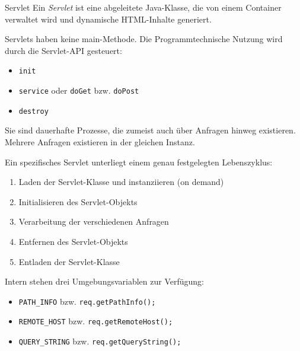 \begin{defi}{Servlet}
    Ein \emph{Servlet} ist eine abgeleitete Java-Klasse, die von einem Container verwaltet wird und dynamische HTML-Inhalte generiert.

    Servlets haben keine main-Methode.
    Die Programmtechnische Nutzung wird durch die Servlet-API gesteuert:
    \begin{itemize}
        \item \texttt{init}
        \item \texttt{service} oder \texttt{doGet} bzw. \texttt{doPost}
        \item \texttt{destroy}
    \end{itemize}

    Sie sind dauerhafte Prozesse, die zumeist auch über Anfragen hinweg existieren.
    Mehrere Anfragen existieren in der gleichen Instanz.

    Ein spezifisches Servlet unterliegt einem genau festgelegten Lebenszyklus:
    \begin{enumerate}
        \item Laden der Servlet-Klasse und instanziieren (on demand)
        \item Initialisieren des Servlet-Objekts
        \item Verarbeitung der verschiedenen Anfragen
        \item Entfernen des Servlet-Objekts
        \item Entladen der Servlet-Klasse
    \end{enumerate}

    Intern stehen drei Umgebungsvariablen zur Verfügung:
    \begin{itemize}
        \item \texttt{PATH\_INFO} bzw. \texttt{req.getPathInfo();}
        \item \texttt{REMOTE\_HOST} bzw. \texttt{req.getRemoteHost();}
        \item \texttt{QUERY\_STRING} bzw. \texttt{req.getQueryString();}
    \end{itemize}
\end{defi}

